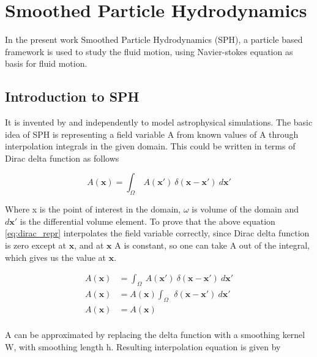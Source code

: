 \chapter{Smoothed Particle Hydrodynamics}
\label{chap:SPH}

In the present work Smoothed Particle Hydrodynamics (SPH), a particle based
framework is used to study the fluid motion, using Navier-stokes
equation as basis for fluid motion.


\section{Introduction to SPH}


It is invented by \cite{lucy1977numerical} and
\cite{gingold1977smoothed} independently to model astrophysical
simulations. The basic idea of SPH is representing a field variable
A from known values of A through interpolation integrals in the given
domain. This could be written in terms of Dirac delta function as follows

\begin{equation}
  \label{eq:dirac_repr}
  A(\boldsymbol{x}) = \int_{\Omega}\> A(\boldsymbol{x}') \> \delta(\boldsymbol{x} - \boldsymbol{x}') \> d\boldsymbol{x}'
\end{equation}

Where x is the point of interest in the domain, $\omega$ is volume of
the domain and $d\boldsymbol{x}'$ is the differential volume element.
To prove that the above equation \eqref{eq:dirac_repr} interpolates the
field variable correctly, since Dirac delta function is zero except at
$\boldsymbol{x}$, and at $\boldsymbol{x}$ A is constant, so one can take
A out of the integral, which gives us the value at $\boldsymbol{x}$.


\begin{align*}
  \label{eq:dirac_derivation}
  A(\boldsymbol{x}) &= \int_{\Omega}\> A(\boldsymbol{x}') \> \delta(\boldsymbol{x} - \boldsymbol{x}') \> d\boldsymbol{x}'\\
  A(\boldsymbol{x}) &= A(\boldsymbol{x}) \int_{\Omega}\> \> \delta(\boldsymbol{x} - \boldsymbol{x}') \> d\boldsymbol{x}'\\
  A(\boldsymbol{x}) &= A(\boldsymbol{x}) \\
\end{align*}

A can be approximated by replacing the delta function with a smoothing
kernel W, with smoothing length h. Resulting interpolation equation is given by

